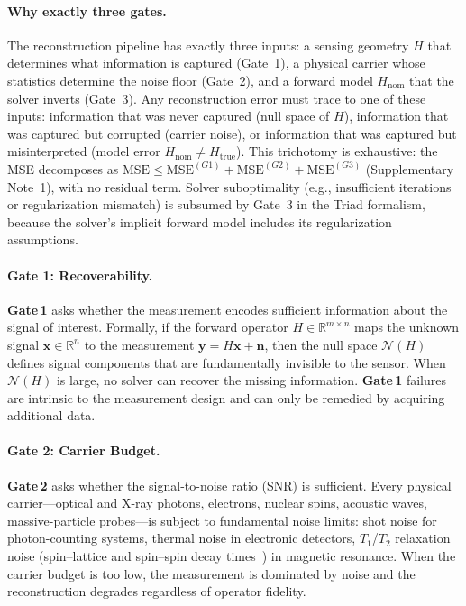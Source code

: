 \documentclass[11pt]{article}
\newcommand{\Hnom}{H_{\mathrm{nom}}}
\newcommand{\Htrue}{H_{\mathrm{true}}}
\newcommand{\gateone}{\textbf{Gate\,1}}
\newcommand{\gatetwo}{\textbf{Gate\,2}}
\begin{document}
\paragraph{Why exactly three gates.}
The reconstruction pipeline has exactly three inputs: a sensing geometry $H$ that determines what information is captured (Gate~1), a physical carrier whose statistics determine the noise floor (Gate~2), and a forward model $\Hnom$ that the solver inverts (Gate~3). Any reconstruction error must trace to one of these inputs: information that was never captured (null space of $H$), information that was captured but corrupted (carrier noise), or information that was captured but misinterpreted (model error $\Hnom \neq \Htrue$). This trichotomy is exhaustive: the MSE decomposes as $\mathrm{MSE} \leq \mathrm{MSE}^{(G1)} + \mathrm{MSE}^{(G2)} + \mathrm{MSE}^{(G3)}$ (Supplementary Note~1), with no residual term. Solver suboptimality (e.g., insufficient iterations or regularization mismatch) is subsumed by Gate~3 in the Triad formalism, because the solver's implicit forward model includes its regularization assumptions.

\paragraph{Gate 1: Recoverability.}
\gateone{} asks whether the measurement encodes sufficient information about the signal of interest. Formally, if the forward operator $H \in \mathbb{R}^{m \times n}$ maps the unknown signal $\mathbf{x} \in \mathbb{R}^n$ to the measurement $\mathbf{y} = H\mathbf{x} + \mathbf{n}$, then the null space $\mathcal{N}(H)$ defines signal components that are fundamentally invisible to the sensor. When $\mathcal{N}(H)$ is large, no solver can recover the missing information. \gateone{} failures are intrinsic to the measurement design and can only be remedied by acquiring additional data.

\paragraph{Gate 2: Carrier Budget.}
\gatetwo{} asks whether the signal-to-noise ratio (SNR) is sufficient. Every physical carrier---optical and X-ray photons, electrons, nuclear spins, acoustic waves, massive-particle probes---is subject to fundamental noise limits: shot noise for photon-counting systems, thermal noise in electronic detectors, $T_1$/$T_2$ relaxation noise (spin--lattice and spin--spin decay times~\cite{bloch1946nuclear}) in magnetic resonance. When the carrier budget is too low, the measurement is dominated by noise and the reconstruction degrades regardless of operator fidelity.
\end{document}
